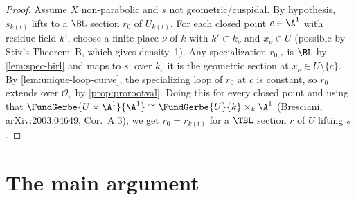 \begin{proof}
  Assume \(X\) non-parabolic and \(s\) not geometric/cuspidal. By hypothesis,
  \(s_{k(t)}\) lifts to a \(\BL\) section \(r_0\) of \(U_{k(t)}\). For each closed
  point \(c \in \A^1\) with residue field \(k'\), choose a finite place \(\nu\) of
  \(k\) with \(k' \subset k_\nu\) and \(x_\nu \in U\) (possible by Stix's Theorem~B,
  which gives density~1). Any specialization \(r_{0,c}\) is \(\BL\) by
  \cref{lem:spec-birl} and maps to \(s\); over \(k_\nu\) it is the geometric section
  at \(x_\nu \in U \setminus \{c\}\). By \cref{lem:unique-loop-curve}, the
  specializing loop of \(r_0\) at \(c\) is constant, so \(r_0\) extends over
  \(\mathcal{O}_c\) by \cref{prop:prorootval}. Doing this for every closed point and
  using that \(\FundGerbe{U \times \A^1}{\A^1} \cong \FundGerbe{U}{k} \times_k \A^1\)
  (Bresciani, arXiv:2003.04649, Cor.\ A.3), we get \(r_0 = r_{k(t)}\) for a
  \(\TBL\) section \(r\) of \(U\) lifting \(s\).
\end{proof}

\section{The main argument}

